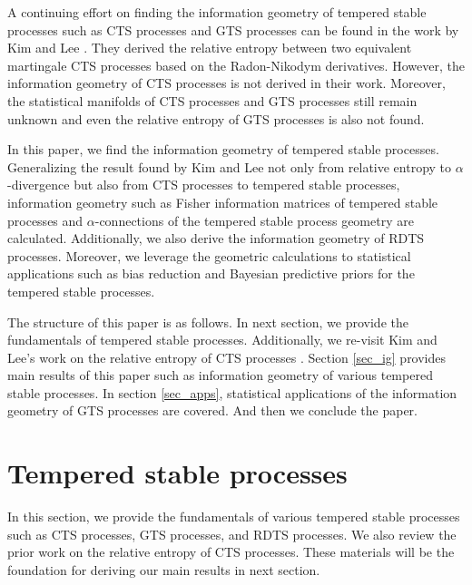 \documentclass[preprint,11pt]{amsart}
\begin{document}
	A continuing effort on finding the information geometry of tempered stable processes such as CTS processes and GTS processes can be found in the work by Kim and Lee \cite{kim2007relative}. They derived the relative entropy between two equivalent martingale CTS processes based on the Radon-Nikodym derivatives. However, the information geometry of CTS processes is not derived in their work. Moreover, the statistical manifolds of CTS processes and GTS processes still remain unknown and even the relative entropy of GTS processes is also not found.
	
	In this paper, we find the information geometry of tempered stable processes. Generalizing the result found by Kim and Lee \cite{kim2007relative} not only from relative entropy to $\alpha$-divergence but also from CTS processes to tempered stable processes, information geometry such as Fisher information matrices of tempered stable processes and $\alpha$-connections of the tempered stable process geometry are calculated. Additionally, we also derive the information geometry of RDTS processes. Moreover, we leverage the geometric calculations to statistical applications such as bias reduction and Bayesian predictive priors for the tempered stable processes. 
	
	The structure of this paper is as follows. In next section, we provide the fundamentals of tempered stable processes. Additionally, we re-visit Kim and Lee's work on the relative entropy of CTS processes \cite{kim2007relative}. Section \ref{sec_ig} provides main results of this paper such as information geometry of various tempered stable processes. In section \ref{sec_apps}, statistical applications of the information geometry of GTS processes are covered. And then we conclude the paper.
	
\section{Tempered stable processes}
	In this section, we provide the fundamentals of various tempered stable processes such as CTS processes, GTS processes, and RDTS processes. We also review the prior work on the relative entropy of CTS processes. These materials will be the foundation for deriving our main results in next section.
\end{document}
